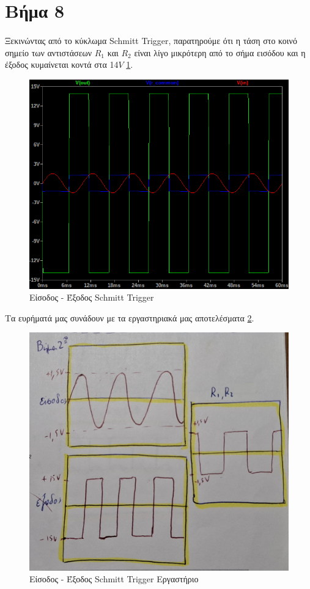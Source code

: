 \documentclass[11pt,a4paper,twoside,onecolumn,openright,final]{memoir}
\begin{document}
\section{Βήμα 8}

\paragraph*{} Ξεκινώντας από το κύκλωμα Schmitt Trigger, παρατηρούμε ότι η τάση στο κοινό σημείο των αντιστάσεων $R_1$ και $R_2$ είναι λίγο μικρότερη από το σήμα εισόδου και η έξοδος κυμαίνεται κοντά στα 14$V$ \ref{fig:ex4plot1}.
\begin{figure}[H]
    \centering
    \includegraphics[width=0.8\linewidth]{figures/Exercise4_step2.png}
    \caption{Είσοδος - Έξοδος Schmitt Trigger}
    \label{fig:ex4plot1}
\end{figure}
Τα ευρήματά μας συνάδουν με τα εργαστηριακά μας αποτελέσματα \ref{fig:ex4lab1}.
\begin{figure}[H]
    \centering
    \includegraphics[width=0.7\linewidth]{figures/Exercise4_lab_step2.jpg}
    \caption{Είσοδος - Έξοδος Schmitt Trigger Εργαστήριο}
    \label{fig:ex4lab1}
\end{figure}
\end{document}
